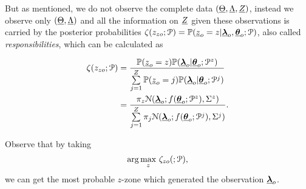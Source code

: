 \documentclass[../main.tex]{subfiles}
\begin{document}
But as mentioned, we do not observe the complete data $(\underline{\Theta},\underline{\Lambda},\underline{Z})$, instead we observe only $(\underline{\Theta},\underline{\Lambda})$ and all the information on $\underline{Z}$ given these observations is carried by the posterior probabilities  ${\zeta(z_{zo};\mathcal{P})=\mathbb{P}(\underline{z}_{o}=z|{\underline{\boldsymbol{\lambda}}}_{o},{\underline{\boldsymbol{\theta}}}_{o};\mathcal{P})}$, also called \emph{responsibilities}, which can be calculated as

\begin{align}
  \label{eq:responsibilities}
  \zeta(z_{zo};\mathcal{P})&=\frac{\mathbb{P}(\underline{z}_{o}=z)\mathbb{P}({\underline{\boldsymbol{\lambda}}}_{o}|{\underline{\boldsymbol{\theta}}}_{o};\mathcal{P}^{z})}{\sum\limits_{j=1}^{Z}\mathbb{P}(\underline{z}_{o}=j)\mathbb{P}({\underline{\boldsymbol{\lambda}}}_{o}|{\underline{\boldsymbol{\theta}}}_{o};\mathcal{P}^{j})}\nonumber\\
                       &=\frac{\pi_{z}{\mathcal{N}({\underline{\boldsymbol{\lambda}}}_{o};f({\underline{\boldsymbol{\theta}}}_{o};\mathcal{P}^{z}),{\Sigma^{z}})}}{\sum\limits_{j=1}^{Z}\pi_{j}\mathcal{N}({\underline{\boldsymbol{\lambda}}}_{o};f({\underline{\boldsymbol{\theta}}}_{o};\mathcal{P}^{j}),{\Sigma^{j}})}.
\end{align}

Observe that by taking
\begin{equation}\label{eq:argmaxz}
  \arg\underset{z}{\max}\ {\zeta_{zo}(;\mathcal{P})},
\end{equation}
we can get the most probable $z$-zone which generated the observation ${\underline{\boldsymbol{\lambda}}}_{o}$.
\end{document}
